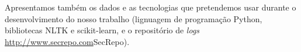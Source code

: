 \documentclass[
	12pt,				%
	openright,			%
	twoside,			%
	a4paper,			%
	english,			%
	spanish,			%
	brazil,				%
	]{abntex2}
\begin{document}
Apresentamos também os dados e as tecnologias que pretendemos usar durante o desenvolvimento do nosso trabalho (lignuagem de programação Python, bibliotecas NLTK e scikit-learn, e o repositório de \emph{logs} \url{http://www.secrepo.com}{SecRepo}).




\postextual



%
%




\printindex
\end{document}
